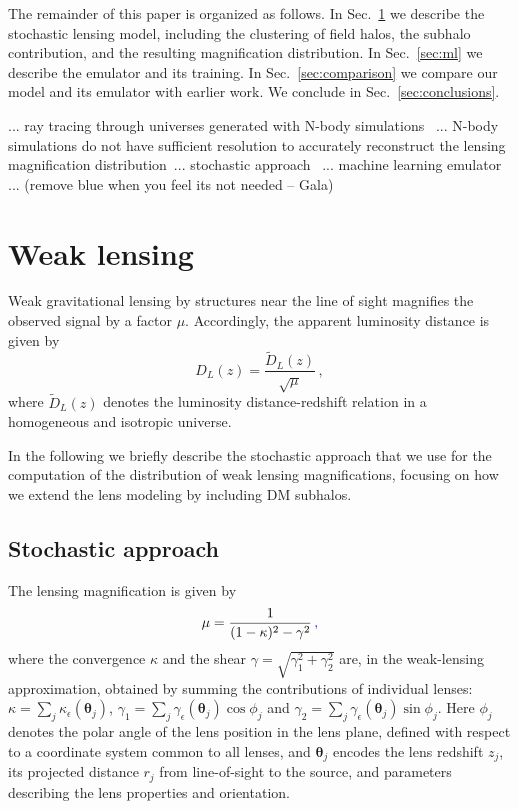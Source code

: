 \documentclass[aps,prd,10pt,nofootinbib,twocolumn,superscriptaddress,floatfix,notitlepage]{revtex4-1}
\newcommand{\vect}[1]{\boldsymbol{#1}}
\newcommand{\be}{\begin{equation}}
\newcommand{\ee}{\end{equation}}
\newcommand{\Gala}[1]{{\color{orange} (#1 -- Gala)}}
\newcommand{\B}[1]{{\color{blue} #1}}
\begin{document}
The remainder of this paper is organized as follows. In Sec.~\ref{sec:lensing} we describe the stochastic lensing model, including the clustering of field halos, the subhalo contribution, and the resulting magnification distribution. In Sec.~\ref{sec:ml} we describe the emulator and its training. In Sec.~\ref{sec:comparison} we compare our model and its emulator with earlier work. We conclude in Sec.~\ref{sec:conclusions}.

\B{... ray tracing through universes generated with N-body simulations~\cite{Holz:1997ic,Holz:2004xx,Takahashi:2011qd,Takahashi:2017hjr} ... N-body simulations do not have sufficient resolution to accurately reconstruct the lensing magnification distribution~\cite{DES:2025omh}... stochastic approach~\cite{Kainulainen:2009dw,Kainulainen:2010at,Kainulainen:2011zx} ... machine learning emulator~\cite{Turker:2025rdt} ...}
\Gala{remove blue when you feel its not needed}

\section{Weak lensing}
\label{sec:lensing}
Weak gravitational lensing by structures near the line of sight magnifies the observed signal by a factor $\mu$. Accordingly, the apparent luminosity distance is given by
\be
    D_L(z) = \frac{\tilde{D}_L(z)}{\sqrt{\mu}} \,,
\ee
where $\tilde{D}_L(z)$ denotes the luminosity distance-redshift relation in a homogeneous and isotropic universe. 

In the following we briefly describe the stochastic approach that we use for the computation of the distribution of weak lensing magnifications, focusing on how we extend the lens modeling by including DM subhalos.


\subsection{Stochastic approach}

The lensing magnification is given by
\be \label{eq:mueq}
	\mu = \frac{1}{(1-\kappa)^2 - \gamma^2} \,\B{,}
\ee
where the convergence $\kappa$ and the shear $\gamma = \sqrt{\gamma_1^2+\gamma_2^2}$ are, in the weak-lensing approximation, obtained by summing the contributions of individual lenses: $\kappa = \sum_j \kappa_\epsilon(\vect\theta_j)$, $\gamma_1 = \sum_j \gamma_\epsilon(\vect\theta_j) \cos\phi_j$ and $\gamma_2 = \sum_j \gamma_\epsilon(\vect\theta_j) \sin\phi_j$. Here $\phi_j$ denotes the polar angle of the lens position in the lens plane, defined with respect to a coordinate system common to all lenses, and $\vect\theta_j$ encodes the lens redshift $z_j$, its projected distance $r_j$ from line-of-sight to the source, and parameters describing the lens properties and orientation.
\end{document}

